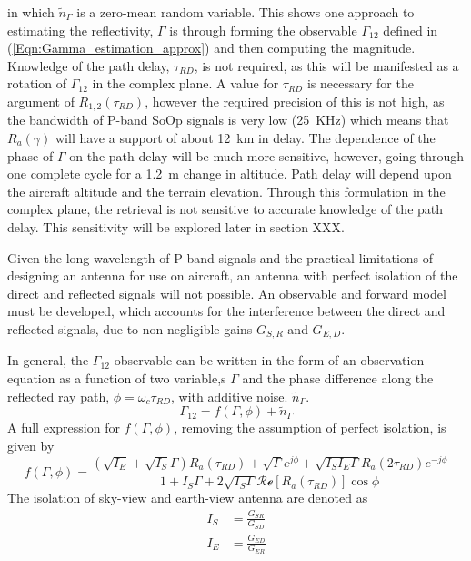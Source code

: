 \documentclass[draftcls,onecolumn]{IEEEtran}  %
\begin{document}
in which $\tilde{n}_\Gamma$ is a zero-mean random variable. 
This shows one approach to estimating the reflectivity, $\Gamma$ is through forming the observable $\Gamma_{12}$ defined in (\ref{Eqn:Gamma_estimation_approx}) and then computing the magnitude.  
Knowledge of the path delay, $\tau_{RD}$, is not required, as this will be manifested as a rotation of $\Gamma_{12}$ in the complex plane. 
A value for $\tau_{RD}$ is necessary for the argument of $R_{1,2}(\tau_{RD})$, however the required precision of this is not high, as the bandwidth of P-band SoOp signals is very low (25~KHz) which means that $R_a(\gamma)$ will have a support of about 12~km in delay.  
The dependence of the phase of $\Gamma$ on the path delay will be much more sensitive, however, going through one complete cycle for a 1.2~m change in altitude.  
Path delay will depend upon the aircraft altitude and the terrain elevation. 
Through this formulation in the complex plane, the retrieval is not sensitive to accurate knowledge of the path delay.  This sensitivity will be explored later in section XXX.


Given the long wavelength of P-band signals and the practical limitations of designing an antenna for use on aircraft, an antenna with perfect isolation of the direct and reflected signals will not possible. 
An observable and forward model must be developed, which accounts for the interference between the direct and reflected signals, due to non-negligible gains $G_{S,R}$ and $G_{E,D}$. 

In general, the $\Gamma_{12}$ observable can be written in the form of an observation equation as a function of two variable,s $\Gamma$ and the phase difference along the reflected ray path, $\phi = \omega_c \tau_{RD}$, with  additive noise.  $\tilde{n}_{\Gamma}$. 
\begin{equation}
\Gamma_{12} = f(\Gamma, \phi) + \tilde{n}_{\Gamma}
  \label{eqn:observation_eqn_general}
\end{equation}
A full expression for $f(\Gamma, \phi)$, removing the assumption of perfect isolation, is given by
\begin{equation}
f(\Gamma, \phi) =
	\frac{(\sqrt{I_E}+\sqrt{I_S}\Gamma)R_a(\tau_{RD})+\sqrt{\Gamma} 
    e^{j\phi}+\sqrt{I_S I_E\Gamma} R_a(2\tau_{RD})e^{-j\phi}} 
    {1 + I_S \Gamma + 2 \sqrt{I_S \Gamma} \mathcal{Re}[ R_a(\tau_{RD})] \cos \phi}
        \label{Eq:Gamma_estimation}
\end{equation}
%
The isolation of sky-view and earth-view antenna are denoted as
\begin{eqnarray}
    I_S& = \frac{G_{SR}}{G_{SD}}\\
   I_E& = \frac{G_{ED}}{G_{ER}}
\end{eqnarray}
\end{document}
